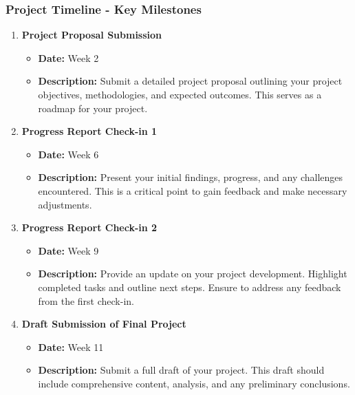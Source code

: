 \documentclass[aspectratio=169]{beamer}
\begin{document}
\begin{frame}[fragile]
  \frametitle{Project Timeline - Key Milestones}
  \begin{enumerate}
    \item \textbf{Project Proposal Submission}
      \begin{itemize}
        \item \textbf{Date:} Week 2
        \item \textbf{Description:} Submit a detailed project proposal outlining your project objectives, methodologies, and expected outcomes. This serves as a roadmap for your project.
      \end{itemize}
      
    \item \textbf{Progress Report Check-in 1}
      \begin{itemize}
        \item \textbf{Date:} Week 6
        \item \textbf{Description:} Present your initial findings, progress, and any challenges encountered. This is a critical point to gain feedback and make necessary adjustments.
      \end{itemize}

    \item \textbf{Progress Report Check-in 2}
      \begin{itemize}
        \item \textbf{Date:} Week 9
        \item \textbf{Description:} Provide an update on your project development. Highlight completed tasks and outline next steps. Ensure to address any feedback from the first check-in.
      \end{itemize}

    \item \textbf{Draft Submission of Final Project}
      \begin{itemize}
        \item \textbf{Date:} Week 11
        \item \textbf{Description:} Submit a full draft of your project. This draft should include comprehensive content, analysis, and any preliminary conclusions.
      \end{itemize}
  \end{enumerate}
\end{frame}
\end{document}
